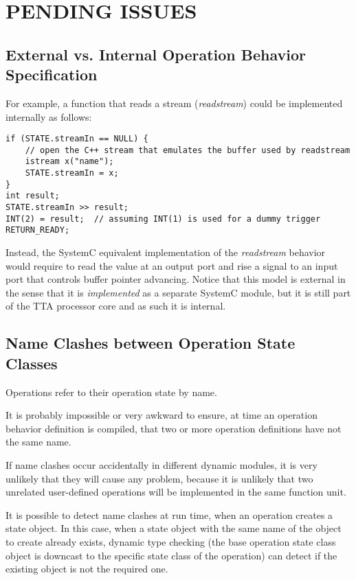 \documentclass[twoside]{tce}
\begin{document}
\chapter{PENDING ISSUES}


\section{External vs. Internal Operation Behavior Specification}
\label{sec:external-vs-internal}

For example, a function that reads a stream (\emph{readstream}) could be
implemented internally as follows:
\begin{verbatim}
if (STATE.streamIn == NULL) {
    // open the C++ stream that emulates the buffer used by readstream
    istream x("name");
    STATE.streamIn = x;
}
int result;
STATE.streamIn >> result;
INT(2) = result;  // assuming INT(1) is used for a dummy trigger
RETURN_READY;
\end{verbatim}

Instead, the SystemC equivalent implementation of the \emph{readstream}
behavior would require to read the value at an output port and rise a
signal to an input port that controls buffer pointer advancing.  Notice that
this model is external in the sense that it is \emph{implemented} as a
separate SystemC module, but it is still part of the TTA processor core and
as such it is internal.

\section{Name Clashes between Operation State Classes}
\label{sec:state-name}

Operations refer to their operation state by name.

It is probably impossible or very awkward to ensure, at time an operation
behavior definition is compiled, that two or more operation definitions
have not the same name.

If name clashes occur accidentally in different dynamic modules, it is very
unlikely that they will cause any problem, because it is unlikely that two
unrelated user-defined operations will be implemented in the same function
unit.

It is possible to detect name clashes at run time, when an operation creates
a state object.  In this case, when a state object with the same name of the
object to create already exists, dynamic type checking (the base operation
state class object is downcast to the specific state class of the operation)
can detect if the existing object is not the required one.
\end{document}
